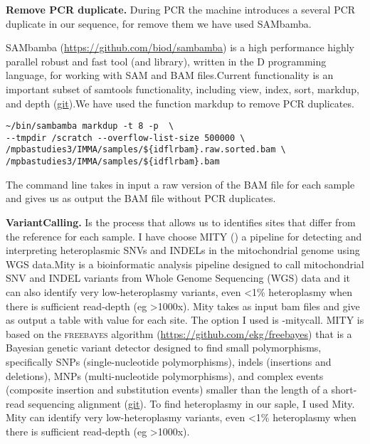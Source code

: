 \textbf{Remove PCR duplicate.} During PCR the machine introduces a several PCR duplicate in our sequence, for remove them we have used SAMbamba.\newline

SAMbamba (\url{https://github.com/biod/sambamba}) is a high performance highly parallel robust and fast tool (and library), written in the D programming language, for working with SAM and BAM files.Current functionality is an important subset of samtools functionality, including view, index, sort, markdup, and depth (\href{https://github.com/biod/sambamba#introduction}{git}).We have used the function markdup to remove PCR duplicates. \newline

\begin{verbatim}
~/bin/sambamba markdup -t 8 -p  \
--tmpdir /scratch --overflow-list-size 500000 \
/mpbastudies3/IMMA/samples/${idflrbam}.raw.sorted.bam \
/mpbastudies3/IMMA/samples/${idflrbam}.bam    
\end{verbatim}

The command line takes in input a raw version of the BAM file for each sample and gives us as output the BAM file without PCR duplicates. \newline

\textbf{VariantCalling.} Is the process that allows us to identifies sites that differ from the reference for each sample. I have choose \textsc{MITY} (\cite{puttick2019mity}) a pipeline for detecting and interpreting heteroplasmic SNVs and INDELs in the mitochondrial genome using WGS data.Mity is a bioinformatic analysis pipeline designed to call mitochondrial SNV and INDEL variants from Whole Genome Sequencing (WGS) data and it can also identify very low-heteroplasmy variants, even <1\% heteroplasmy when there is sufficient read-depth (eg >1000x). Mity  takes as input bam files and give as output a table with value for each site. The option I used is -mitycall. \textsc{MITY} is based on the \textsc{freebayes} algorithm (\url{https://github.com/ekg/freebayes}) that is a Bayesian genetic variant detector designed to find small polymorphisms, specifically SNPs (single-nucleotide polymorphisms), indels (insertions and deletions), MNPs (multi-nucleotide polymorphisms), and complex events (composite insertion and substitution events) smaller than the length of a short-read sequencing alignment (\href{https://github.com/ekg/freebayes}{git}).
To find heteroplasmy in our saple, I used Mity.
Mity can identify very low-heteroplasmy variants, even <1\% heteroplasmy when there is sufficient read-depth (eg >1000x). \newline

